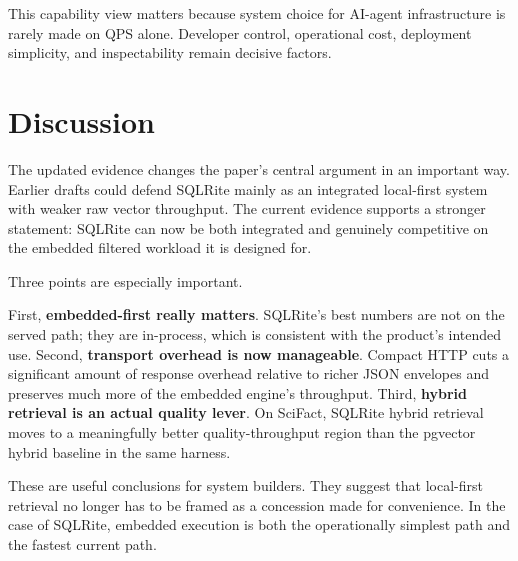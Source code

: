 \documentclass[11pt]{article}
\begin{document}
This capability view matters because system choice for AI-agent infrastructure is rarely made on QPS alone. Developer control, operational cost, deployment simplicity, and inspectability remain decisive factors.

\section{Discussion}
The updated evidence changes the paper's central argument in an important way. Earlier drafts could defend SQLRite mainly as an integrated local-first system with weaker raw vector throughput. The current evidence supports a stronger statement: SQLRite can now be both integrated and genuinely competitive on the embedded filtered workload it is designed for.

Three points are especially important.

First, \textbf{embedded-first really matters}. SQLRite's best numbers are not on the served path; they are in-process, which is consistent with the product's intended use. Second, \textbf{transport overhead is now manageable}. Compact HTTP cuts a significant amount of response overhead relative to richer JSON envelopes and preserves much more of the embedded engine's throughput. Third, \textbf{hybrid retrieval is an actual quality lever}. On SciFact, SQLRite hybrid retrieval moves to a meaningfully better quality-throughput region than the pgvector hybrid baseline in the same harness.

These are useful conclusions for system builders. They suggest that local-first retrieval no longer has to be framed as a concession made for convenience. In the case of SQLRite, embedded execution is both the operationally simplest path and the fastest current path.
\end{document}
